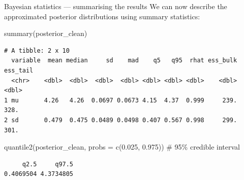 \documentclass[
  ignorenonframetext,
  aspectratio=169,
  t]{beamer}
\newenvironment{Shaded}{\begin{snugshade}}{\end{snugshade}}
\newcommand{\AttributeTok}[1]{\textcolor[rgb]{0.40,0.45,0.13}{#1}}
\newcommand{\CommentTok}[1]{\textcolor[rgb]{0.37,0.37,0.37}{#1}}
\newcommand{\FloatTok}[1]{\textcolor[rgb]{0.68,0.00,0.00}{#1}}
\newcommand{\FunctionTok}[1]{\textcolor[rgb]{0.28,0.35,0.67}{#1}}
\newcommand{\NormalTok}[1]{\textcolor[rgb]{0.00,0.23,0.31}{#1}}
\begin{document}
\begin{frame}[fragile]{Bayesian statistics --- summarising the results}
\protect{}\label{bayesian-statistics-summarising-the-results}
We can now describe the approximated posterior distributions using
summary statistics:

\footnotesize

\begin{Shaded}
\begin{Highlighting}[]
\FunctionTok{summary}\NormalTok{(posterior\_clean)}
\end{Highlighting}
\end{Shaded}

\begin{verbatim}
# A tibble: 2 x 10
  variable  mean median     sd    mad    q5   q95  rhat ess_bulk ess_tail
  <chr>    <dbl>  <dbl>  <dbl>  <dbl> <dbl> <dbl> <dbl>    <dbl>    <dbl>
1 mu       4.26   4.26  0.0697 0.0673 4.15  4.37  0.999     239.     328.
2 sd       0.479  0.475 0.0489 0.0498 0.407 0.567 0.998     299.     301.
\end{verbatim}

\normalsize

\pause

\vspace{1em}

\footnotesize

\begin{Shaded}
\begin{Highlighting}[]
\FunctionTok{quantile2}\NormalTok{(posterior\_clean, }\AttributeTok{probs =} \FunctionTok{c}\NormalTok{(}\FloatTok{0.025}\NormalTok{, }\FloatTok{0.975}\NormalTok{)) }\CommentTok{\# 95\% credible interval}
\end{Highlighting}
\end{Shaded}

\begin{verbatim}
     q2.5     q97.5 
0.4069504 4.3734805 
\end{verbatim}

\normalsize
\end{frame}
\end{document}
